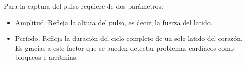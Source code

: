\documentclass[11pt,a4paper]{article}
\begin{document}
Para la captura del pulso requiere de dos parámetros:

\begin{itemize}
	\item Amplitud. Refleja la altura del pulso, es decir, la fuerza del latido.
	\item Período. Refleja la duración del ciclo completo de un solo latido del corazón. Es gracias a este factor que se pueden detectar problemas cardíacos como bloqueos o arrítmias.
\end{itemize}
\end{document}
